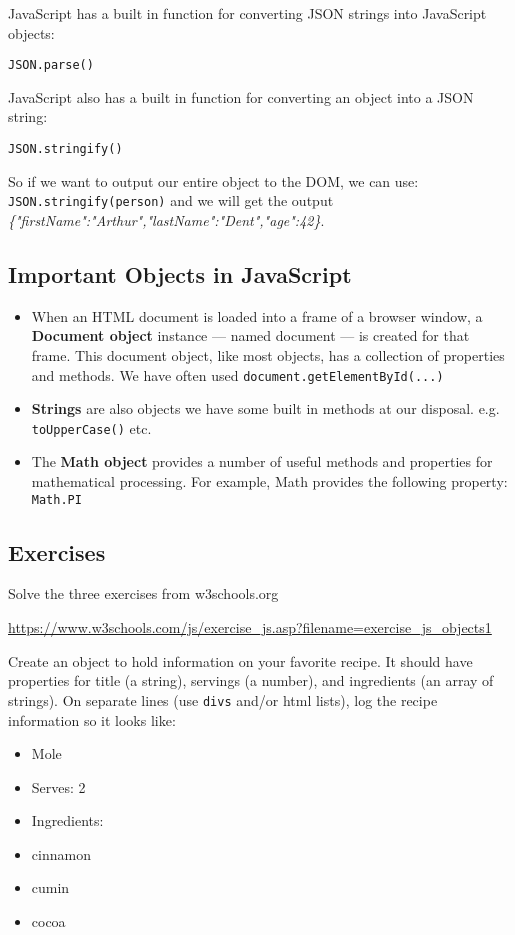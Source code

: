 \documentclass[11pt,a4paper]{report}
\begin{document}
JavaScript has a built in function for converting JSON strings into JavaScript objects:

\verb|JSON.parse()|

JavaScript also has a built in function for converting an object into a JSON string:

\verb|JSON.stringify()|

So if we want to output our entire object to the DOM, we can use: \verb|JSON.stringify(person)| and we will get the output \emph{\{"firstName":"Arthur","lastName":"Dent","age":42\}}.

\subsection{Important Objects in JavaScript}

\begin{itemize}
\item When an HTML document is loaded into a frame of a browser window, a {\bf Document object} instance — named document — is created for that frame. This document object, like most objects, has a collection of properties and methods. We have often used \verb|document.getElementById(...)|
\item {\bf Strings} are also objects we have some built in methods at our disposal. e.g. \verb|toUpperCase()| etc.
\item The {\bf Math object} provides a number of useful methods and properties for mathematical processing. For example, Math provides the following property: \verb|Math.PI|
\end{itemize}

\subsection{Exercises}
\begin{ex}
Solve the three exercises from w3schools.org

\url{https://www.w3schools.com/js/exercise_js.asp?filename=exercise_js_objects1}


\end{ex}

\begin{ex}
Create an object to hold information on your favorite recipe. It should have properties for title (a string), servings (a number), and ingredients (an array of strings).
On separate lines (use \verb|divs| and/or html lists), log the recipe information so it looks like:
\begin{itemize}
\item Mole
\item Serves: 2
\item Ingredients:
\item cinnamon
\item cumin
\item cocoa
\end{itemize}

\end{ex}
\end{document}

